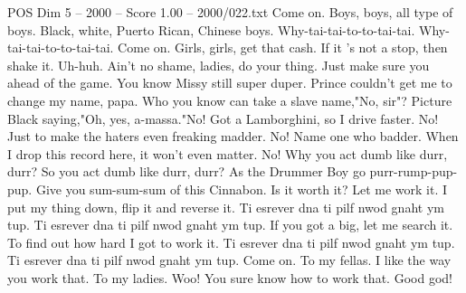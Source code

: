 \begin{textsample}{POS Dim 5 – 2000 – Score 1.00 – 2000/022.txt}
Come on.
Boys, boys, all type of boys.
Black, white, Puerto Rican, Chinese boys.
Why-tai-tai-to-to-tai-tai.
Why-tai-tai-to-to-tai-tai.
Come on.
Girls, girls, get that cash.
If it 's not a stop, then shake it.
Uh-huh.
Ain't no shame, ladies, do your thing.
Just make sure you ahead of the game.
You know Missy still super duper.
Prince couldn't get me to change my name, papa.
Who you know can take a slave name,"No, sir"?
Picture Black saying,"Oh, yes, a-massa."No!
Got a Lamborghini, so I drive faster.
No!
Just to make the haters even freaking madder.
No!
Name one who badder.
When I drop this record here, it won't even matter.
No!
Why you act dumb like durr, durr?
So you act dumb like durr, durr?
As the Drummer Boy go purr-rump-pup-pup.
Give you sum-sum-sum of this Cinnabon.
Is it worth it?
Let me work it.
I put my thing down, flip it and reverse it.
Ti esrever dna ti pilf nwod gnaht ym tup.
Ti esrever dna ti pilf nwod gnaht ym tup.
If you got a big, let me search it.
To find out how hard I got to work it.
Ti esrever dna ti pilf nwod gnaht ym tup.
Ti esrever dna ti pilf nwod gnaht ym tup.
Come on.
To my fellas.
I like the way you work that.
To my ladies.
Woo!
You sure know how to work that.
Good god!

\end{textsample}
